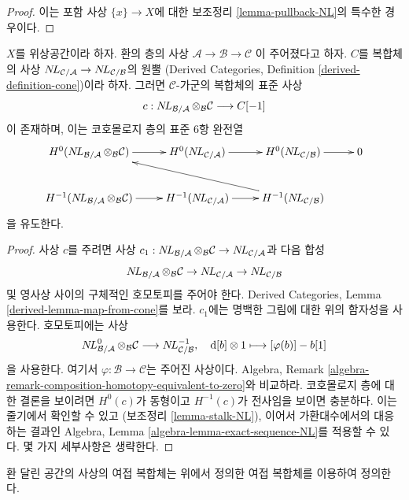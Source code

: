 \begin{proof}
이는 포함 사상 $\{x\} \to X$에 대한 보조정리
\ref{lemma-pullback-NL}의 특수한 경우이다.
\end{proof}

\begin{lemma}
\label{lemma-exact-sequence-NL}
$X$를 위상공간이라 하자. 환의 층의 사상
$\mathcal{A} \to \mathcal{B} \to \mathcal{C}$
이 주어졌다고 하자. $C$를 복합체의 사상
$\mathop{N\!L}\nolimits_{\mathcal{C}/\mathcal{A}} \to \mathop{N\!L}\nolimits_{\mathcal{C}/\mathcal{B}}$의 원뿔
(Derived Categories, Definition \ref{derived-definition-cone})이라 하자.
그러면 $\mathcal{C}$-가군의 복합체의 표준 사상
$$
c :
\mathop{N\!L}\nolimits_{\mathcal{B}/\mathcal{A}} \otimes_\mathcal{B} \mathcal{C}
\longrightarrow
C[-1]
$$
이 존재하며, 이는 코호몰로지 층의 표준 6항 완전열
$$
\xymatrix{
H^0(\NL_{\mathcal{B}/\mathcal{A}} \otimes_\mathcal{B} \mathcal{C}) \ar[r] &
H^0(\NL_{\mathcal{C}/\mathcal{A}}) \ar[r] &
H^0(\NL_{\mathcal{C}/\mathcal{B}}) \ar[r] &
0 \\
H^{-1}(\NL_{\mathcal{B}/\mathcal{A}} \otimes_\mathcal{B} \mathcal{C}) \ar[r] &
H^{-1}(\NL_{\mathcal{C}/\mathcal{A}}) \ar[r] &
H^{-1}(\NL_{\mathcal{C}/\mathcal{B}}) \ar[llu]
}
$$
을 유도한다.
\end{lemma}

\begin{proof}
사상 $c$를 주려면 사상
$c_1 : \mathop{N\!L}\nolimits_{\mathcal{B}/\mathcal{A}} \otimes_\mathcal{B} \mathcal{C}
\to \mathop{N\!L}\nolimits_{\mathcal{C}/\mathcal{A}}$과 다음 합성
$$
\mathop{N\!L}\nolimits_{\mathcal{B}/\mathcal{A}} \otimes_\mathcal{B} \mathcal{C} \to
\mathop{N\!L}\nolimits_{\mathcal{C}/\mathcal{A}} \to \mathop{N\!L}\nolimits_{\mathcal{C}/\mathcal{B}}
$$
및 영사상 사이의 구체적인 호모토피를 주어야 한다. Derived Categories,
Lemma \ref{derived-lemma-map-from-cone}를 보라. $c_1$에는 명백한 그림에
대한 위의 함자성을 사용한다. 호모토피에는 사상
$$
\mathop{N\!L}\nolimits_{\mathcal{B}/\mathcal{A}}^0 \otimes_\mathcal{B} \mathcal{C}
\longrightarrow
\mathop{N\!L}\nolimits_{\mathcal{C}/\mathcal{B}}^{-1},\quad
\text{d}[b] \otimes 1 \longmapsto [\varphi(b)] - b[1]
$$
을 사용한다. 여기서 $\varphi : \mathcal{B} \to \mathcal{C}$는 주어진
사상이다. Algebra, Remark
\ref{algebra-remark-composition-homotopy-equivalent-to-zero}와 비교하라.
코호몰로지 층에 대한 결론을 보이려면 $H^0(c)$가 동형이고
$H^{-1}(c)$가 전사임을 보이면 충분하다. 이는 줄기에서 확인할 수 있고
(보조정리 \ref{lemma-stalk-NL}), 이어서 가환대수에서의 대응하는 결과인
Algebra, Lemma \ref{algebra-lemma-exact-sequence-NL}를 적용할 수 있다.
몇 가지 세부사항은 생략한다.
\end{proof}

\noindent
환 달린 공간의 사상의 여접 복합체는 위에서 정의한 여접 복합체를
이용하여 정의한다.


